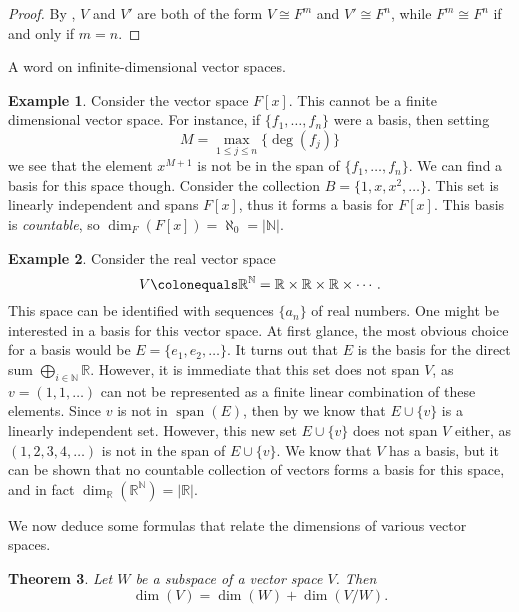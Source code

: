 \documentclass[12pt]{report}
\newtheorem{theorem}{Theorem}[chapter]
\numberwithin{equation}{section}
\numberwithin{theorem}{chapter}
\theoremstyle{definition}
\newtheorem{example}[theorem]{Example}
\newtheorem*{basic properties}{Basic Properties}
\newtheorem*{Important Remark}{Important Remark}
\newcommand{\N}{\mathbb{N}}
\DeclareMathOperator{\Span}{span}
\begin{document}
\begin{proof}
	By , $V$ and $V'$ are both of the form $V \cong F^m$ and $V'\cong F^n$, while $F^m \cong F^n$ if and only if $m=n$.
\end{proof}

A word on infinite-dimensional vector spaces.
 
\begin{example}\label{F[x] infinite dim}
Consider the vector space $F[x]$. This cannot be a finite dimensional vector space. For instance, if $\{f_1 , \dots , f_n\}$ were a basis, then setting
$$M = \max_{1 \leqslant j \leqslant n}\{ \deg(f_j)\}$$
we see that the element $x^{M+1}$ is not be in the span of $\{f_1 , \dots , f_n\}$. We can find a basis for this space though. Consider the collection $B = \{1, x, x^2 , \ldots \}$. This set is linearly independent and spans $F[x]$, thus it forms a basis for $F[x]$. This basis is {\em countable}, so $\dim_F(F[x])= \aleph_0 = |\N|$.
\end{example}

\begin{example}
Consider the real vector space 
$$V \colonequals \mathbb{R}^\N = \mathbb{R}\times \mathbb{R}\times \mathbb{R} \times \cdots.$$ 
This space can be identified with sequences $\{a_n\}$ of real numbers. One might be interested in a basis for this vector space. At first glance, the most obvious choice for a basis would be $E = \{e_1,e_2,\ldots\}$. It turns out that $E$ is the basis for the direct sum $\bigoplus_{i\in \N}\mathbb{R}$. However, it is immediate that this set does not span $V$, as $v = (1,1,\ldots)$ can not be represented as a finite linear combination of these elements. Since $v$ is not in $\Span(E)$, then by  we know that $E \cup \{v\}$ is a linearly independent set. However, this new set $E \cup \{v\}$ does not span $V$ either, as $(1, 2, 3, 4, \ldots)$ is not in the span of $E \cup \{v\}$. We know that $V$ has a basis, but it can be shown that no countable collection of vectors forms a basis for this space, and in fact $\dim_\mathbb{R} (\mathbb{R}^\N) =|\mathbb{R}|$. 
\end{example}

 
We now deduce some formulas that relate the dimensions of various vector spaces.
 
 
 
\begin{theorem}\label{dimension formula subspaces}
 Let $W$ be a subspace of a vector space $V$. Then 
 $$\dim(V) = \dim(W) + \dim(V/W).$$
 \end{theorem}
 
\end{document}
